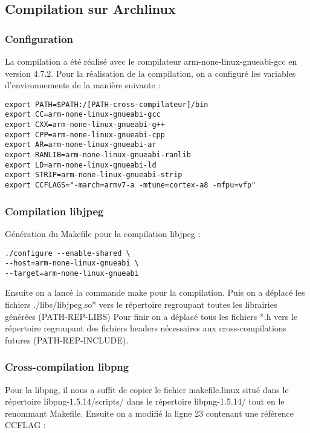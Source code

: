 \newpage

\subsection{Compilation sur Archlinux}

\subsubsection{Configuration}
La compilation a été réalisé avec le compilateur arm-none-linux-gnueabi-gcc en version 4.7.2.
Pour la réalisation de la compilation, on a configuré les variables d'environnements de la manière suivante : 

\begin{lstlisting}
export PATH=$PATH:/[PATH-cross-compilateur]/bin
export CC=arm-none-linux-gnueabi-gcc
export CXX=arm-none-linux-gnueabi-g++
export CPP=arm-none-linux-gnueabi-cpp
export AR=arm-none-linux-gnueabi-ar
export RANLIB=arm-none-linux-gnueabi-ranlib
export LD=arm-none-linux-gnueabi-ld
export STRIP=arm-none-linux-gnueabi-strip
export CCFLAGS="-march=armv7-a -mtune=cortex-a8 -mfpu=vfp"
\end{lstlisting}

\subsubsection{Compilation libjpeg}
Génération du Makefile pour la compilation libjpeg :

\begin{lstlisting}
./configure --enable-shared \
--host=arm-none-linux-gnueabi \
--target=arm-none-linux-gnueabi
\end{lstlisting}

Ensuite on a lancé la commande make pour la compilation.
Puis on a déplacé les fichiers ./libs/libjpeg.so* vers le répertoire regroupant toutes les librairies générées (PATH-REP-LIBS)
Pour finir on a déplacé tous les fichiers *.h vers le répertoire regroupant des fichiers headers nécessaires aux cross-compilations futures (PATH-REP-INCLUDE).

\subsubsection{Cross-compilation libpng}
Pour la libpng, il nous a suffit de copier le fichier makefile.linux situé dans le répertoire libpng-1.5.14/scripts/ dans le répertoire libpng-1.5.14/ tout en le renommant Makefile. Ensuite on a modifié la ligne 23 contenant une référence CCFLAG : 

